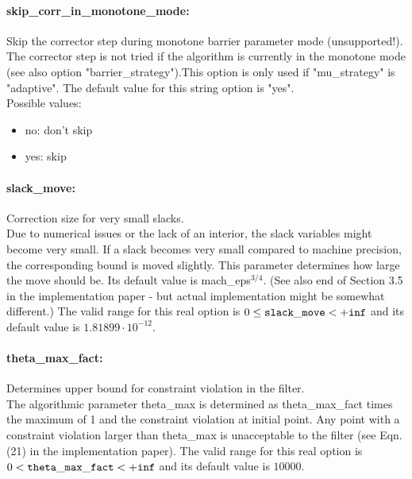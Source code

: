 \paragraph{skip\_corr\_in\_monotone\_mode:}\label{sec:skip_corr_in_monotone_mode} Skip the corrector step during monotone barrier parameter mode (unsupported!). $\;$ \\
 The corrector step is not tried if the algorithm
is currently in the monotone mode (see also
option "barrier\_strategy").This option is only
used if "mu\_strategy" is "adaptive".
The default value for this string option is "yes".
\\ 
Possible values:
\begin{itemize}
   \item no: don't skip
   \item yes: skip
\end{itemize}

\paragraph{slack\_move:}\label{sec:slack_move} Correction size for very small slacks. $\;$ \\
 Due to numerical issues or the lack of an
interior, the slack variables might become very
small.  If a slack becomes very small compared to
machine precision, the corresponding bound is
moved slightly.  This parameter determines how
large the move should be.  Its default value is
mach\_eps$^{3/4}$.  (See also end of Section 3.5
in the implementation paper - but actual
implementation might be somewhat different.) The valid range for this real option is 
$0 \le {\tt slack\_move } <  {\tt +inf}$
and its default value is $1.81899 \cdot 10^{-12}$.


\paragraph{theta\_max\_fact:}\label{sec:theta_max_fact} Determines upper bound for constraint violation in the filter. $\;$ \\
 The algorithmic parameter theta\_max is
determined as theta\_max\_fact times the maximum
of 1 and the constraint violation at initial
point.  Any point with a constraint violation
larger than theta\_max is unacceptable to the
filter (see Eqn. (21) in the implementation
paper). The valid range for this real option is 
$0 <  {\tt theta\_max\_fact } <  {\tt +inf}$
and its default value is $10000$.


